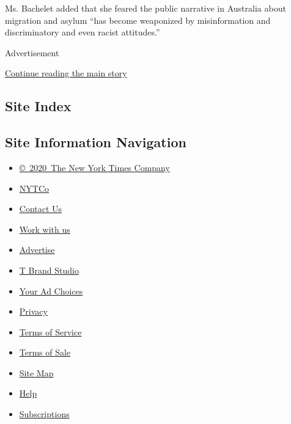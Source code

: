 Ms. Bachelet added that she feared the public narrative in Australia
about migration and asylum ``has become weaponized by misinformation and
discriminatory and even racist attitudes.''

Advertisement

\protect\hyperlink{after-bottom}{Continue reading the main story}

\hypertarget{site-index}{%
\subsection{Site Index}\label{site-index}}

\hypertarget{site-information-navigation}{%
\subsection{Site Information
Navigation}\label{site-information-navigation}}

\begin{itemize}
\tightlist
\item
  \href{https://help.nytimes.com/hc/en-us/articles/115014792127-Copyright-notice}{©~2020~The
  New York Times Company}
\end{itemize}

\begin{itemize}
\tightlist
\item
  \href{https://www.nytco.com/}{NYTCo}
\item
  \href{https://help.nytimes.com/hc/en-us/articles/115015385887-Contact-Us}{Contact
  Us}
\item
  \href{https://www.nytco.com/careers/}{Work with us}
\item
  \href{https://nytmediakit.com/}{Advertise}
\item
  \href{http://www.tbrandstudio.com/}{T Brand Studio}
\item
  \href{https://www.nytimes.com/privacy/cookie-policy\#how-do-i-manage-trackers}{Your
  Ad Choices}
\item
  \href{https://www.nytimes.com/privacy}{Privacy}
\item
  \href{https://help.nytimes.com/hc/en-us/articles/115014893428-Terms-of-service}{Terms
  of Service}
\item
  \href{https://help.nytimes.com/hc/en-us/articles/115014893968-Terms-of-sale}{Terms
  of Sale}
\item
  \href{https://spiderbites.nytimes.com}{Site Map}
\item
  \href{https://help.nytimes.com/hc/en-us}{Help}
\item
  \href{https://www.nytimes.com/subscription?campaignId=37WXW}{Subscriptions}
\end{itemize}
